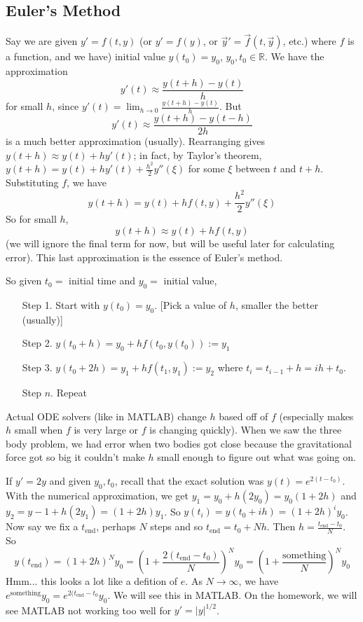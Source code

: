 \documentclass{article}
\theoremstyle{plain}
\theoremstyle{remark}
\newcommand{\R}{{\mathbb R}}
\begin{document}
\subsection{Euler's Method}
Say we are given $y' = f(t,y)$
(or $y' = f(y)$, or $\vec{y}' = \vec{f}(t,\vec{y})$, etc.)
where $f$ is a function,
and we have) initial value $y(t_0) = y_0$, $y_0,t_0 \in \R$.
We have the approximation
\[
	y'(t) \approx \frac{y(t+h) - y(t)}{h}
\]
for small $h$, since $y'(t) = \lim_{h\to0}\frac{y(t+h) - y(t)}{h}$.
But
\[
	y'(t) \approx \frac{y(t+h) - y(t-h)}{2h}
\]
is a much better approximation (usually).
Rearranging gives $y(t+h) \approx y(t) + hy'(t)$;
in fact, by Taylor's theorem, $y(t+h) = y(t) + hy'(t) + \frac{h^2}{2}y''(\xi)$
for some $\xi$ between $t$ and $t+h$.
Substituting $f$, we have
\[
	y(t+h) = y(t) + hf(t,y) + \frac{h^2}{2}y''(\xi)
\]
So for small $h$,
\[
	y(t+h) \approx y(t) + hf(t,y)
\]
(we will ignore the final term for now, but will be useful later for calculating error).
This last approximation is the essence of Euler's method.

So given $t_0 = $ initial time and $y_0 = $ initial value,
\begin{enumerate}
	\item[Step 1.] Start with $y(t_0) = y_0$.
		[Pick a value of $h$, smaller the better (usually)]
	\item[Step 2.] $y(t_0 + h) = y_0 + hf(t_0,y(t_0)) := y_1$
	\item[Step 3.] $y(t_0+2h) = y_1 + hf(t_1,y_1) := y_2$
		where $t_i = t_{i-1} + h = ih+t_0$.
	\item[Step $n$.] Repeat
\end{enumerate}

Actual ODE solvers (like in MATLAB) change $h$ based off of $f$
(especially makes $h$ small when $f$ is very large or $f$ is changing quickly).
When we saw the three body problem, we had error when two bodies got close
because the gravitational force got so big it couldn't make $h$ small enough
to figure out what was going on.

If $y' = 2y$ and given $y_0,t_0$,
recall that the exact solution was $y(t) = e^{2(t-t_0)}$.
With the numerical approximation, we get
$y_1 = y_0 + h(2y_0) = y_0(1+2h)$
and $y_2 = y-1 + h(2y_1) = (1+2h)y_1$.
So $y(t_i) = y(t_0 + ih) = (1+2h)^iy_0$.
Now say we fix a $t_{\text{end}}$, perhaps $N$ steps
and so $t_{\text{end}} = t_0 + Nh$.
Then $h = \frac{t_{\text{end}} - t_0}{N}$.
So
\[
	y(t_{\text{end}}) = (1+2h)^Ny_0
	= \left(1+\frac{2(t_{\text{end}} - t_0)}{N}\right)^Ny_0
	= \left(1+\frac{\text{something}}{N}\right)^Ny_0
\]
Hmm... this looks a lot like a defition of $e$.
As $N \to \infty$, we have $e^{\text{something}}y_0 = e^{2(t_{\text{end}}-t_0}y_0$.
We will see this in MATLAB.
On the homework, we will see MATLAB not working too well for $y' = \lvert y \rvert^{1/2}$.
\end{document}
